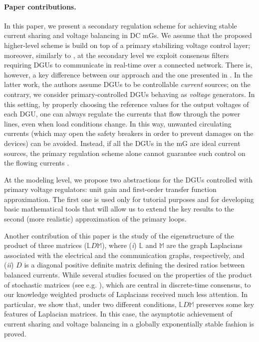\documentclass[a4paper]{article}
\theoremstyle{plain}
\begin{document}
\paragraph{Paper contributions.}
In this paper, we present a secondary regulation scheme for achieving stable current sharing and voltage
	balancing in DC mGs. We assume that the proposed higher-level scheme is build on top of a primary stabilizing voltage control layer; moreover, similarly to
	\cite{zhao2015distributed}, at the secondary level we exploit consensus filters requiring DGUs to communicate in real-time over a connected network. 
	There is, however, a key difference between our approach and the one presented in \cite{zhao2015distributed}. In the latter work, the authors assume DGUs to be controllable \textit{current} sources; on the contrary, we consider primary-controlled DGUs behaving as \textit{voltage} generators. In this setting, by properly choosing the reference values for the output voltages of each DGU, one can always regulate the currents that flow through the power lines, even when load conditions change. In this way, unwanted circulating currents (which may open the safety breakers in order to prevent damages on the devices) can be avoided. Instead, if all the DGUs in the mG are ideal current sources, the primary regulation scheme alone cannot guarantee such control on the flowing currents \cite{zhao2015distributed}. 
	
	At the modeling level, we propose two abstractions for the DGUs controlled with primary voltage regulators: unit gain and first-order transfer function approximation. The first one is used only for tutorial purposes and for developing basic mathematical tools that will allow us to extend the key results to the second (more realistic) approximation of the primary loops.
	
	Another contribution of this paper is the study of the eigenstructure of the product of three matrices ($\mathbb{L} D \mathbb{M}$), where (\textit{i}) $\mathbb{L}$ and $\mathbb{M}$ are the graph Laplacians associated with the electrical
	and the communication graphs, respectively, and (\textit{ii}) $D$ is a diagonal positive definite matrix defining the desired ratios between balanced currents. While several studies focused on the properties of the product of stochastic
	matrices (see e.g. \cite{jadbabaie2003coordination}), which are
	central in discrete-time consensus, to our knowledge weighted products of
	Laplacians received much less attention. In particular, we show that, under two different conditions, $\mathbb{L}D\mathbb{M}$ preserves some key features of Laplacian matrices. In this case, the asymptotic achievement of current sharing and voltage balancing in a globally exponentially stable fashion is proved.
	
\end{document}

